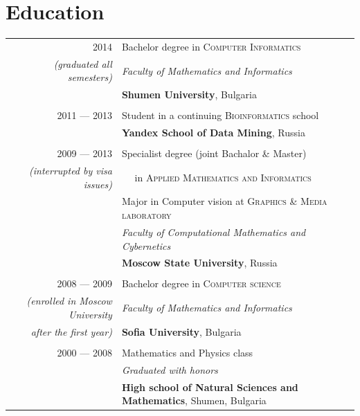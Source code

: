 \documentclass[a4paper,10pt]{article}
\def\myline{\color{linegray}\vline}
\begin{document}
\section{Education}
\hspace{0mm}\begin{tabular}{r!{\myline}p{14cm}}
  \textsc{2014}     &  Bachelor degree in \textsc{Computer Informatics}\\
        \small\textit{(graduated all semesters)}  &  \textit{Faculty of Mathematics and Informatics}\\
                                  &  \textbf{Shumen University}, Bulgaria\\

        \\
        \textsc{2011 --- 2013}     &  Student in a continuing \textsc{Bioinformatics} school\\
	                          &  \textbf{Yandex School of Data Mining}, Russia\\
	

        \\
  \textsc{2009 --- 2013}     &  Specialist degree {\small(joint Bachalor \& Master)}\\
        \small\textit{(interrupted by visa issues)} &  $\quad$ in \textsc{Applied Mathematics and Informatics}\\
                                  &  Major in Computer vision at \textsc{Graphics \& Media laboratory}\\
                                  &  \textit{Faculty of Computational Mathematics and Cybernetics}\\
                                  &  \textbf{Moscow State University}, Russia\\

	\\
	\textsc{2008 --- 2009}     &  Bachelor degree in \textsc{Computer science}\\
        {\small\textit{(enrolled in Moscow University}} &  \textit{Faculty of Mathematics and Informatics}\\
        {\small\textit{after the first year)}} &  \textbf{Sofia University}, Bulgaria\\
	
	\\
	\textsc{2000 --- 2008}     &  Mathematics and Physics class\\
                                  &  \textit{Graduated with honors}\\
                                  &  \textbf{High school of Natural Sciences and Mathematics}, Shumen, Bulgaria\\
\end{tabular}
\par\smallskip
\end{document}
